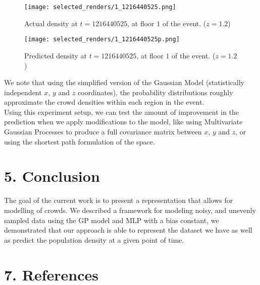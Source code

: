 \documentclass[letterpaper]{article}
\begin{document}
\begin{figure}[h!]
  \centering
    \texttt{[image: selected\_renders/1\_1216440525.png]}
  \caption{Actual density at $t=1216440525$, at floor $1$ of the event. ($z = 1.2$)}
  \label{fig:t3dist}
\end{figure}

\begin{figure}[h!]
  \centering
    \texttt{[image: selected\_renders/1\_1216440525p.png]}
  \caption{Predicted density at $t=1216440525$, at floor $1$ of the event. ($z = 1.2$)}
  \label{fig:t4dist}
\end{figure}

We note that using the simplified version of the Gaussian Model (statistically independent $x$, $y$ and $z$ coordinates), the probability distributions roughly approximate the crowd densities within each region in the event. \\

Using this experiment setup, we can test the amount of improvement in the prediction when we apply modifications to the model, like using Multivariate Gaussian Processes to produce a full covariance matrix between $x$, $y$ and $z$, or using the shortest path formulation of the space.

\section{5.  Conclusion}

The goal of the current work is to present a representation that allows for modelling of crowds. We described a framework for modeling noisy, and unevenly sampled
data using the GP model and MLP with a bias constant, we demonstrated that our approach is able to represent the dataset we have as well as predict the population density at a given point of time.

\section{7.  References}
\end{document}
